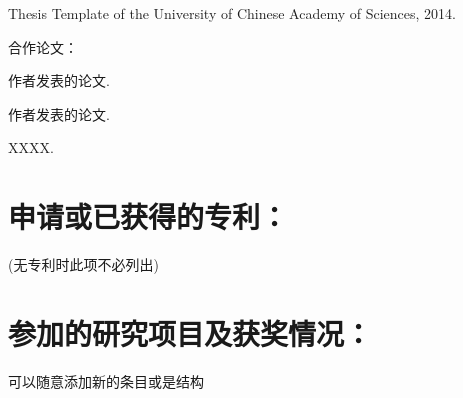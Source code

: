 \noindent
\stepaddpaper  Thesis Template of the University of Chinese Academy of Sciences, 2014.


\noindent
合作论文：

\setcounter{mycnt}{0}

\noindent
\stepaddpaper 作者发表的论文.

\noindent
\stepaddpaper 作者发表的论文.

\noindent
\stepaddpaper XXXX.


\section*{申请或已获得的专利：}
\noindent
(无专利时此项不必列出)

\section*{参加的研究项目及获奖情况：}
\noindent
可以随意添加新的条目或是结构



